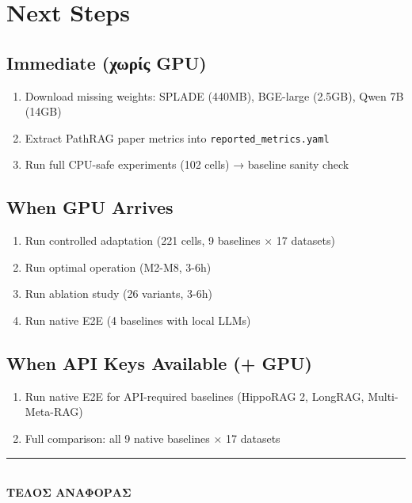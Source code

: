 \documentclass[11pt,a4paper]{article}
\begin{document}
\section{Next Steps}

\subsection*{Immediate (χωρίς GPU)}
\begin{enumerate}[nosep]
  \item Download missing weights: SPLADE (440MB), BGE-large (2.5GB), Qwen 7B (14GB)
  \item Extract PathRAG paper metrics into \texttt{reported\_metrics.yaml}
  \item Run full CPU-safe experiments (102 cells) → baseline sanity check
\end{enumerate}

\subsection*{When GPU Arrives}
\begin{enumerate}[nosep]
  \item Run controlled adaptation (221 cells, 9 baselines × 17 datasets)
  \item Run optimal operation (M2-M8, 3-6h)
  \item Run ablation study (26 variants, 3-6h)
  \item Run native E2E (4 baselines with local LLMs)
\end{enumerate}

\subsection*{When API Keys Available (+ GPU)}
\begin{enumerate}[nosep]
  \item Run native E2E for API-required baselines (HippoRAG 2, LongRAG, Multi-Meta-RAG)
  \item Full comparison: all 9 native baselines × 17 datasets
\end{enumerate}

\vspace{1em}
\begin{center}
\rule{0.5\linewidth}{0.4pt}\\[4pt]
\textbf{ΤΕΛΟΣ ΑΝΑΦΟΡΑΣ}
\end{center}
\end{document}
